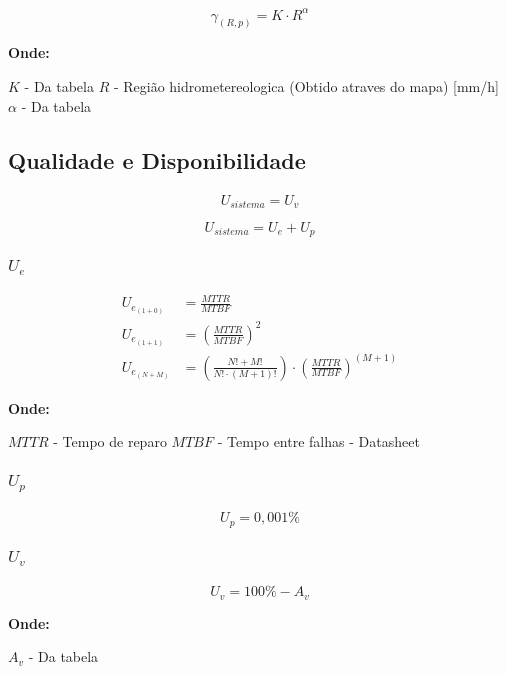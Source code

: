\documentclass[11pt]{article} %
\begin{document}
\begin{equation}
{\gamma}_{(R, p)} = K \cdot R^{\alpha}
\end{equation}

\textbf{Onde:}

$K$ - Da tabela \newline
$R$ - Região hidrometereologica (Obtido atraves do mapa) [mm/h] \newline
$\alpha$ - Da tabela

\subsection{Qualidade e Disponibilidade}

\paragraph{}

\begin{equation}
U_{sistema} = U_{v}
\end{equation}

\begin{equation}
U_{sistema} = U_{e} + U_{p}
\end{equation}

\subsubsection{$U_{e}$}

\begin{subequations}
\begin{align}
{U}_{e_{(1 + 0)}} & = \frac{MTTR}{MTBF}\\
{U}_{e_{(1 + 1)}} & = \left ( \frac{MTTR}{MTBF} \right ) ^ 2 \\
{U}_{e_{(N + M)}} & = \left ( \frac{N! + M!}{N! \cdot (M + 1)!} \right ) \cdot \left ( \frac{MTTR}{MTBF} \right ) ^{(M + 1)}
\end{align}
\end{subequations}

\textbf{Onde:}

$MTTR$ - Tempo de reparo \newline
$MTBF$ - Tempo entre falhas - Datasheet

\subsubsection{$U_{p}$}

\paragraph{}

\begin{equation}
U_{p} = 0,001\%
\end{equation}

\subsubsection{$U_{v}$}

\paragraph{}

\begin{equation}
U_{v} = 100\% - A_{v}
\end{equation}

\textbf{Onde:}

$A_{v}$ - Da tabela
\end{document}
